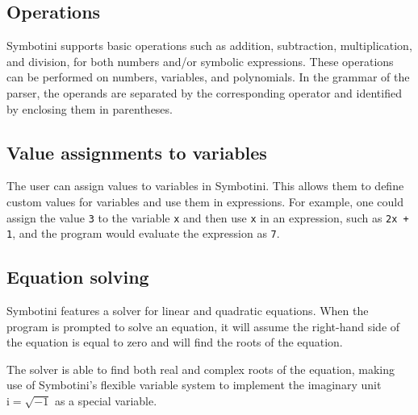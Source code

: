 \subsection{Operations}\label{subsec:arithmetic-operations}

Symbotini supports basic operations such as addition, subtraction, multiplication, and division, for both numbers and/or symbolic expressions. These operations can be performed on numbers, variables, and polynomials. In the grammar of the parser, the operands are separated by the corresponding operator and identified by enclosing them in parentheses.

\subsection{Value assignments to variables}\label{subsec:value-assignments}

The user can assign values to variables in Symbotini. This allows them to define custom values for variables and use them in expressions. For example, one could assign the value \verb|3| to the variable \verb|x| and then use \verb|x| in an expression, such as \verb|2x + 1|, and the program would evaluate the expression as \verb|7|.

\subsection{Equation solving}\label{subsec:equation-solving}

Symbotini features a solver for linear and quadratic equations. When the program is prompted to solve an equation, it will assume the right-hand side of the equation is equal to zero and will find the roots of the equation.

The solver is able to find both real and complex roots of the equation, making use of Symbotini's flexible variable system to implement the imaginary unit $\mathrm{i} = \sqrt{-1}$ as a special variable.
